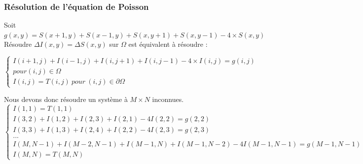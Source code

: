 \subsubsection{Résolution de l'équation de Poisson} 
Soit $g(x,y) = S(x+1,y) + S(x-1,y)+ S(x,y+1) + S(x,y-1) - 			4\times S(x,y)$\\
Résoudre $\Delta I(x,y) = \Delta S(x,y)$ sur $\Omega$ est équivalent à résoudre :\\
\begin{center}
\begin{equation*}
    \left \{
    \begin{aligned}
    I(i+1,j) + I(i-1,j)+ I(i,j+1) + I(i, j-1) - 4\times 			I(i,j)= g(i,j)\\ pour (i,j)\in \Omega \\
    I(i,j) = T(i,j) \ pour \ (i,j) \in \partial \Omega
    \end{aligned}
    \right.
\end{equation*}
\end{center}
Nous devons donc résoudre un système à $M\times N $ inconnues.
\begin{equation}
\left\{
\begin{aligned}
I(1,1) = T(1,1)\\
I(3,2)+I(1,2)+ I(2,3)+I(2,1)-4I(2,2) =g(2,2) \\
I(3,3)+I(1,3)+ I(2,4)+I(2,2)-4I(2,3) =g(2,3)             \\
... \\
I(M,N-1)+I(M-2,N-1)+ I(M-1,N)+I(M-1,N-2)-4I(M-1,N-1) =g(M-1,N-1)\\
I(M, N) = T(M, N)
\end{aligned}
\right.
\end{equation}

